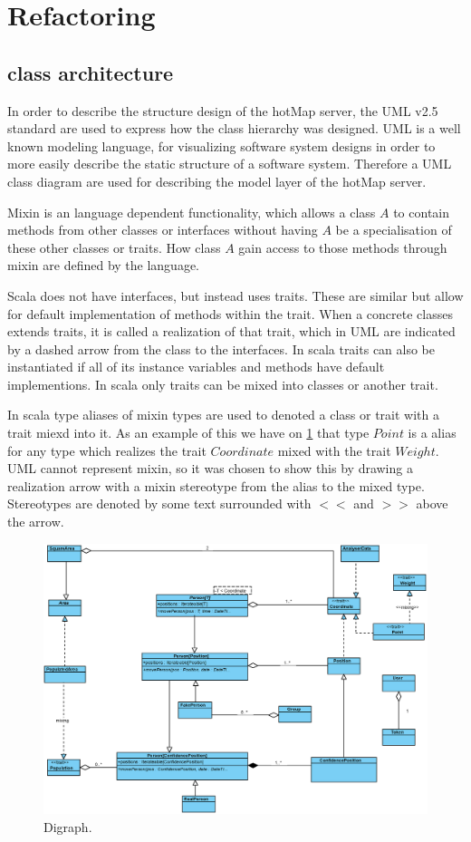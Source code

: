 \section{Refactoring} \label{sec:s4_refactoring}



\subsection{class architecture}
In order to describe the structure design of the hotMap server, the UML v2.5 standard are used to express how the class hierarchy was designed. UML is a well known modeling language, for visualizing software system designs in order to more easily describe the static structure of a software system.
Therefore a UML class diagram are used for describing the model layer of the hotMap server.

Mixin is an language dependent functionality, which allows a class $A$ to contain methods from other classes or interfaces without having $A$ be a specialisation of these other classes or traits. How class $A$ gain access to those methods through mixin are defined by the language. 

Scala does not have interfaces, but instead uses traits. These are similar but allow for default implementation of methods within the trait. When a concrete classes extends traits, it is called a realization of that trait, which in UML are indicated by a dashed arrow from the class to the interfaces. In scala traits can also be instantiated if all of its instance variables and methods have default implementions. In scala only traits can be mixed into classes or another trait.


In scala type aliases of mixin types are used to denoted a class or trait with a trait miexd into it. As an example of this we have on \cref{fig:class} that type $Point$ is a alias for any type which realizes the trait $Coordinate$ mixed with the trait $Weight$. UML cannot represent mixin, so it was chosen to show this by drawing a realization arrow with a mixin stereotype from the alias to the mixed type. Stereotypes are denoted by some text surrounded with $<<$ and $>>$ above the arrow.

\begin{figure}
\centering
\includegraphics[width=\linewidth]{figures/class.eps}
\caption{Digraph.}
\label{fig:class}
\end{figure}



